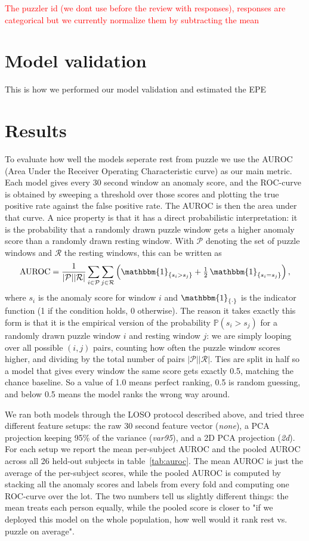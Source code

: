 \documentclass{article}
\begin{document}
\textcolor{red}{The puzzler id (we dont use before the review with responses), responses are categorical but we currently normalize them by subtracting the mean}


\section*{Model validation}
This is how we performed our model validation and estimated the EPE

\section*{Results}
To evaluate how well the models seperate rest from puzzle we use the AUROC (Area Under the Receiver Operating Characteristic curve) as our main metric. Each model gives every 30 second window an anomaly score, and the ROC-curve is obtained by sweeping a threshold over those scores and plotting the true positive rate against the false positive rate. The AUROC is then the area under that curve. A nice property is that it has a direct probabilistic interpretation: it is the probability that a randomly drawn puzzle window gets a higher anomaly score than a randomly drawn resting window. With $\mathcal{P}$ denoting the set of puzzle windows and $\mathcal{R}$ the resting windows, this can be written as
\begin{equation}
    \mathrm{AUROC} = \frac{1}{|\mathcal{P}||\mathcal{R}|} \sum_{i \in \mathcal{P}} \sum_{j \in \mathcal{R}} \left(\mathbbm{1}_{\{s_i > s_j\}} + \tfrac{1}{2}\,\mathbbm{1}_{\{s_i = s_j\}}\right),
\end{equation}
where $s_i$ is the anomaly score for window $i$ and $\mathbbm{1}_{\{\cdot\}}$ is the indicator function (1 if the condition holds, 0 otherwise). The reason it takes exactly this form is that it is the empirical version of the probability $\mathbb{P}(s_i > s_j)$ for a randomly drawn puzzle window $i$ and resting window $j$: we are simply looping over all possible $(i, j)$ pairs, counting how often the puzzle window scores higher, and dividing by the total number of pairs $|\mathcal{P}||\mathcal{R}|$. Ties are split in half so a model that gives every window the same score gets exactly 0.5, matching the chance baseline. So a value of 1.0 means perfect ranking, 0.5 is random guessing, and below 0.5 means the model ranks the wrong way around.

We ran both models through the LOSO protocol described above, and tried three different feature setups: the raw 30 second feature vector (\textit{none}), a PCA projection keeping 95\% of the variance (\textit{var95}), and a 2D PCA projection (\textit{2d}). For each setup we report the mean per-subject AUROC and the pooled AUROC across all 26 held-out subjects in table~\ref{tab:auroc}. The mean AUROC is just the average of the per-subject scores, while the pooled AUROC is computed by stacking all the anomaly scores and labels from every fold and computing one ROC-curve over the lot. The two numbers tell us slightly different things: the mean treats each person equally, while the pooled score is closer to "if we deployed this model on the whole population, how well would it rank rest vs. puzzle on average".
\end{document}
